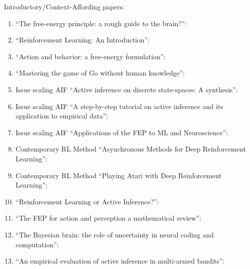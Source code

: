 \documentclass[12pt, oneside]{article}
\begin{document}
Introductory/Context-Affording papers:
\begin{enumerate}
	\item ``The free-energy principle: a rough guide to the brain?'': \textcite{FEP-Rough-Guide-Brain}
	\item ``Reinforcement Learning: An Introduction'': \textcite{Reinforcement-Learning-An-Introduction}
	\item ``Action and behavior: a free-energy formulation'': \textcite{Action-Behaviour-FE}
	\item ``Mastering the game of Go without human knowledge'': \textcite{Mastering-Go-Without-Human-Knowledge}

	\item Issue scaling AIF ``Active inference on discrete state-spaces: A synthesis'': \textcite{AIF-Discrete-Action-Spaces-Synthesis}
	\item Issue scaling AIF ``A step-by-step tutorial on active inference and its application to empirical data'': \textcite{Step-by-Step-Tutorial-AIF-Empirical-Data}
	\item Issue scaling AIF ``Applications of the FEP to ML and Neuroscience'': \textcite{Applications-of-FEP-Machine-Learning-Neuroscience}

	\item Contemporary RL Method ``Asynchronous Methods for Deep Reinforcement Learning'': \textcite{Async-Methods-Deep-RL}
	\item Contemporary RL Method ``Playing Atari with Deep Reinforcement Learning'': \textcite{ATARI-Deep-RL}

	\item ``Reinforcement Learning or Active Inference?'': \textcite{RL-or-AIF}
	\item ``The FEP for action and perception a mathematical review'': \textcite{FEP-Mathematical-Review}
	\item ``The Bayesian brain: the role of uncertainty in neural coding and computation'': \textcite{The-Bayesian-Brain}
	\item ``An empirical evaluation of active inference in multi-armed bandits'': \textcite{Emperical-Eval-AIF-Multi-Arm-Bandits}
\end{enumerate}
\end{document}
